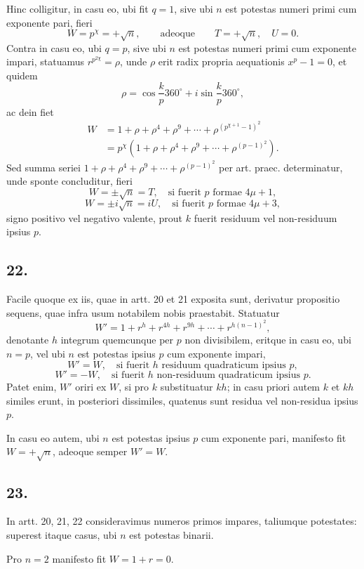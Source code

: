 \documentclass[12pt]{article}
\begin{document}
Hinc colligitur, in casu eo, ubi fit $q=1$, sive ubi $n$ est potestas numeri primi cum exponente pari, fieri
\[
W=p^\chi=+\sqrt n,\qquad\text{adeoque}\qquad T=+\sqrt n,\quad U=0.
\]
Contra in casu eo, ubi $q=p$, sive ubi $n$ est potestas numeri primi cum exponente impari, statuamus $r^{p^{2\chi}}=\rho$, unde $\rho$ erit radix propria aequationis $x^p-1=0$, et quidem
\[
\rho=\cos\frac{k}{p}360^\circ+i\sin\frac{k}{p}360^\circ,
\]
ac dein fiet
\[
\begin{aligned}
W&=1+\rho+\rho^4+\rho^9+\cdots+\rho^{(p^{\chi+1}-1)^2}\\
&=p^\chi(1+\rho+\rho^4+\rho^9+\cdots+\rho^{(p-1)^2}).
\end{aligned}
\]
Sed summa seriei $1+\rho+\rho^4+\rho^9+\cdots+\rho^{(p-1)^2}$ per art. praec. determinatur, unde sponte concluditur, fieri
\[
W=\pm\sqrt n=T,\quad\text{si fuerit }p\text{ formae }4\mu+1,
\]
\[
W=\pm i\sqrt n=iU,\quad\text{si fuerit }p\text{ formae }4\mu+3,
\]
signo positivo vel negativo valente, prout $k$ fuerit residuum vel non-residuum ipsius $p$.

\subsection*{22.}

Facile quoque ex iis, quae in artt. 20 et 21 exposita sunt, derivatur propositio sequens, quae infra usum notabilem nobis praestabit. Statuatur
\[
W'=1+r^h+r^{4h}+r^{9h}+\cdots+r^{h(n-1)^2},
\]
denotante $h$ integrum quemcunque per $p$ non divisibilem, eritque in casu eo, ubi $n=p$, vel ubi $n$ est potestas ipsius $p$ cum exponente impari,
\[
W'=W,\quad\text{si fuerit }h\text{ residuum quadraticum ipsius }p,
\]
\[
W'=-W,\quad\text{si fuerit }h\text{ non-residuum quadraticum ipsius }p.
\]
Patet enim, $W'$ oriri ex $W$, si pro $k$ substituatur $kh$; in casu priori autem $k$ et $kh$ similes erunt, in posteriori dissimiles, quatenus sunt residua vel non-residua ipsius $p$.

In casu eo autem, ubi $n$ est potestas ipsius $p$ cum exponente pari, manifesto fit $W=+\sqrt n$, adeoque semper $W'=W$.

\subsection*{23.}

In artt. 20, 21, 22 consideravimus numeros primos impares, taliumque potestates: superest itaque casus, ubi $n$ est potestas binarii.

Pro $n=2$ manifesto fit $W=1+r=0$.
\end{document}
